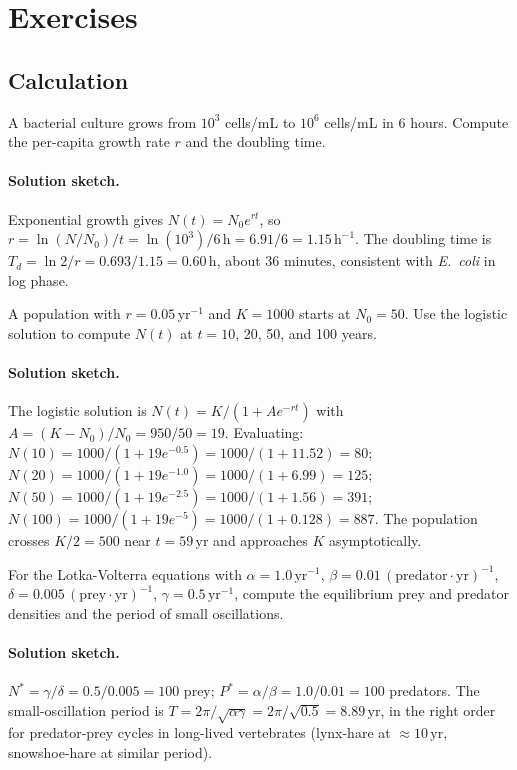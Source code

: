 \section{Exercises}

\subsection*{Calculation}

\begin{exercise}
A bacterial culture grows from $10^3$ cells/mL to $10^6$ cells/mL in
6 hours. Compute the per-capita growth rate $r$ and the doubling
time.

\paragraph{Solution sketch.} Exponential growth gives
$N(t) = N_0 e^{rt}$, so
$r = \ln(N/N_0)/t = \ln(10^3)/6\,\text{h} = 6.91/6 = 1.15\,
\text{h}^{-1}$. The doubling time is $T_d = \ln 2 / r =
0.693/1.15 = 0.60\,\text{h}$, about 36 minutes, consistent with
\emph{E.\ coli} in log phase.
\end{exercise}

\begin{exercise}
A population with $r = 0.05\,\text{yr}^{-1}$ and $K = 1000$ starts at
$N_0 = 50$. Use the logistic solution to compute $N(t)$ at $t = 10$,
20, 50, and 100 years.

\paragraph{Solution sketch.} The logistic solution is
$N(t) = K / (1 + A e^{-rt})$ with $A = (K - N_0)/N_0 = 950/50 = 19$.
Evaluating: $N(10) = 1000/(1 + 19 e^{-0.5}) = 1000/(1 + 11.52) =
80$; $N(20) = 1000/(1 + 19 e^{-1.0}) = 1000/(1 + 6.99) = 125$;
$N(50) = 1000/(1 + 19 e^{-2.5}) = 1000/(1 + 1.56) = 391$; $N(100) =
1000/(1 + 19 e^{-5}) = 1000/(1 + 0.128) = 887$. The population
crosses $K/2 = 500$ near $t = 59\,\text{yr}$ and approaches $K$
asymptotically.
\end{exercise}

\begin{exercise}
For the Lotka-Volterra equations with $\alpha = 1.0\,\text{yr}^{-1}$,
$\beta = 0.01\,(\text{predator}\cdot\text{yr})^{-1}$, $\delta =
0.005\,(\text{prey}\cdot\text{yr})^{-1}$, $\gamma = 0.5\,\text{yr}^{-1}$,
compute the equilibrium prey and predator densities and the period of
small oscillations.

\paragraph{Solution sketch.} $N^* = \gamma/\delta = 0.5/0.005 =
100$ prey; $P^* = \alpha/\beta = 1.0/0.01 = 100$ predators. The
small-oscillation period is
$T = 2\pi/\sqrt{\alpha\gamma} = 2\pi/\sqrt{0.5} = 8.89\,\text{yr}$,
in the right order for predator-prey cycles in long-lived
vertebrates (lynx-hare at $\approx 10\,\text{yr}$, snowshoe-hare at
similar period).
\end{exercise}

